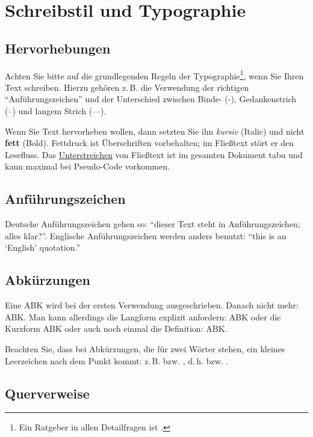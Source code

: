 \chapter{Schreibstil und Typographie}


\section{Hervorhebungen}
\label{Einleitung:Textauszeichnungen}

Achten Sie bitte auf die grundlegenden Regeln der Typographie\footnote{Ein Ratgeber in allen Detailfragen ist \cite{Forssman2002}.}, wenn Sie Ihren Text schreiben. Hierzu gehören z.\,B. die Verwendung der richtigen "`Anführungszeichen"' und der Unterschied zwischen Binde- (-), Gedankenstrich (--) und langem Strich (---).

Wenn Sie Text hervorheben wollen, dann setzten Sie ihn \textit{kursiv} (Italic) und nicht \textbf{fett} (Bold). Fettdruck ist Überschriften vorbehalten; im Fließtext stört er den Lesefluss. Das \underline{Unterstreichen} von Fließtext ist im gesamten Dokument tabu und kann maximal bei Pseudo-Code vorkommen.


\section{Anführungszeichen}

Deutsche Anführungszeichen gehen so: "`dieser Text steht in \glq Anführungszeichen\grq; alles klar?"'. Englische Anführungszeichen werden anders benutzt: ``this is an `English' quotation.''


\section{Abkürzungen}

Eine \ac{ABK} wird bei der ersten Verwendung ausgeschrieben. Danach nicht mehr: \ac{ABK}. Man kann allerdings die Langform explizit anfordern: \acl{ABK} oder die Kurzform \acs{ABK} oder auch noch einmal die Definition: \acf{ABK}.

Beachten Sie, dass bei Abkürzungen, die für zwei Wörter stehen, ein kleines Leerzeichen nach dem Punkt kommt: z.\,B. bzw. \zb, d.\,h. bzw. \dahe.


\section{Querverweise}

